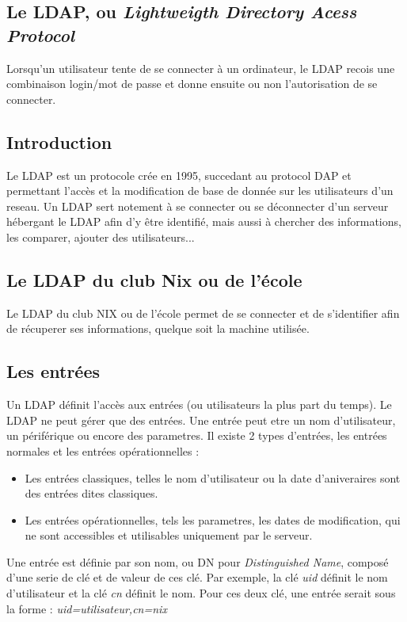 \subsection{Le LDAP, ou \textit{Lightweigth Directory Acess Protocol}}

Lorsqu'un utilisateur tente de se connecter à un ordinateur, le LDAP recois une combinaison login/mot de passe et donne ensuite ou non l'autorisation de se connecter.


\subsection{Introduction}

Le LDAP est un protocole crée en 1995, succedant au protocol DAP et permettant l'accès et la modification de base de donnée sur les utilisateurs d'un reseau. Un LDAP sert notement à se connecter ou se déconnecter d'un serveur hébergant le LDAP afin d'y être identifié, mais aussi à chercher des informations, les comparer, ajouter des utilisateurs...
\subsection{Le LDAP du club Nix ou de l'école}
Le LDAP du club NIX ou de l'école permet de se connecter et de s'identifier afin de récuperer ses informations, quelque soit la machine utilisée.


\subsection{Les entrées}

Un LDAP définit l'accès aux entrées (ou utilisateurs la plus part du temps).
Le LDAP ne peut gérer que des entrées. Une entrée peut etre un nom d'utilisateur, un périférique ou encore des parametres. Il existe 2 types d'entrées, les entrées normales et les entrées opérationnelles :
\begin{itemize}
    \item Les entrées classiques, telles le nom d'utilisateur ou la date d'aniveraires sont des entrées dites classiques.
    \item Les entrées opérationnelles, tels les parametres, les dates de modification, qui ne sont accessibles et utilisables uniquement par le serveur.
\end{itemize}
Une entrée est définie par son nom, ou DN pour \textit{Distinguished Name}, composé d'une serie de clé et de valeur de ces clé. Par exemple, la clé \textit{uid} définit le nom d'utilisateur et la clé \textit{cn} définit le nom. Pour ces deux clé, une entrée serait sous la forme : \textit{uid=utilisateur,cn=nix}


